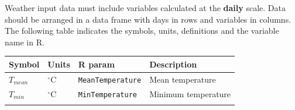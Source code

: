 \documentclass[]{book}
\begin{document}
Weather input data must include variables calculated at the
\textbf{daily} scale. Data should be arranged in a data frame with days
in rows and variables in columns. The following table indicates the
symbols, units, definitions and the variable name in R.

\begin{longtable}[]{@{}llll@{}}
\toprule
\begin{minipage}[b]{0.11\columnwidth}\raggedright\strut
Symbol\strut
\end{minipage} & \begin{minipage}[b]{0.10\columnwidth}\raggedright\strut
Units\strut
\end{minipage} & \begin{minipage}[b]{0.12\columnwidth}\raggedright\strut
R param\strut
\end{minipage} & \begin{minipage}[b]{0.45\columnwidth}\raggedright\strut
Description\strut
\end{minipage}\tabularnewline
\midrule
\endhead
\begin{minipage}[t]{0.11\columnwidth}\raggedright\strut
\(T_{mean}\)\strut
\end{minipage} & \begin{minipage}[t]{0.10\columnwidth}\raggedright\strut
\(^{\circ} \mathrm{C}\)\strut
\end{minipage} & \begin{minipage}[t]{0.12\columnwidth}\raggedright\strut
\texttt{MeanTemperature}\strut
\end{minipage} & \begin{minipage}[t]{0.45\columnwidth}\raggedright\strut
Mean temperature\strut
\end{minipage}\tabularnewline
\begin{minipage}[t]{0.11\columnwidth}\raggedright\strut
\(T_{min}\)\strut
\end{minipage} & \begin{minipage}[t]{0.10\columnwidth}\raggedright\strut
\(^{\circ} \mathrm{C}\)\strut
\end{minipage} & \begin{minipage}[t]{0.12\columnwidth}\raggedright\strut
\texttt{MinTemperature}\strut
\end{minipage} & \begin{minipage}[t]{0.45\columnwidth}\raggedright\strut
Minimum temperature\strut
\end{minipage}\tabularnewline
\begin{minipage}[t]{0.11\columnwidth}\raggedright\strut

\end{minipage}
\end{longtable}
\end{document}
